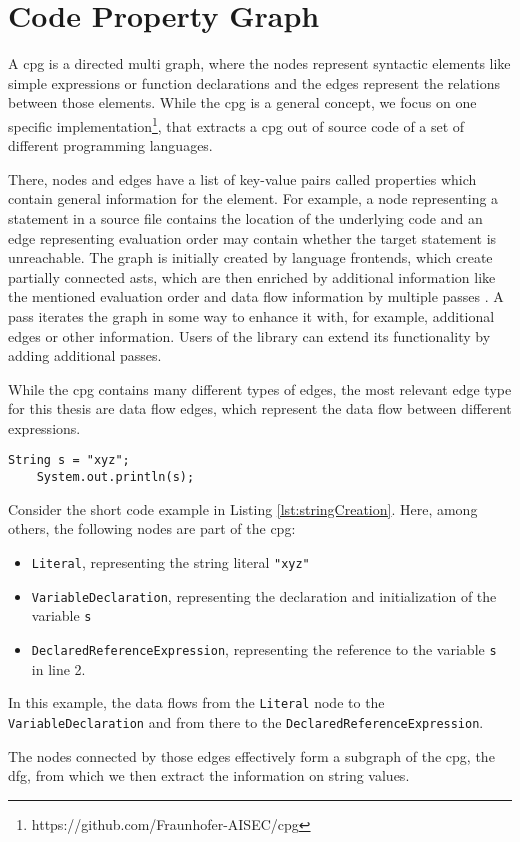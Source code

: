\section{Code Property Graph}\label{sec:background:cpg}
A \acf{cpg} is a directed multi graph, where the nodes represent syntactic elements like simple expressions or function declarations and the edges represent the relations between those elements.
While the \ac{cpg} is a general concept, we focus on one specific implementation\footnote{https://github.com/Fraunhofer-AISEC/cpg}, that extracts a \ac{cpg} out of source code of a set of different programming languages.

There, nodes and edges have a list of key-value pairs called properties which contain general information for the element. For example, a node representing a statement in a source file contains the location of the underlying code and an edge representing evaluation order may contain whether the target statement is unreachable. The graph is initially created by language frontends, which create partially connected \acp{ast}, which are then enriched by additional information like the mentioned evaluation order and data flow information by multiple passes \cite{cpg}. A pass iterates the graph in some way to enhance it with, for example, additional edges or other information.
Users of the library can extend its functionality by adding additional passes.

While the \ac{cpg} contains many different types of edges, the most relevant edge type for this thesis are data flow edges, which represent the data flow between different expressions.

\begin{lstlisting}[label={lst:stringCreation}, caption={\ac{cpg} example code}, captionpos=b, numbers=right]
	String s = "xyz";
	System.out.println(s);
\end{lstlisting}

Consider the short code example in Listing \ref{lst:stringCreation}. Here, among others, the following nodes are part of the \ac{cpg}:

\begin{itemize}
	\item \lstinline|Literal|, representing the string literal \lstinline{"xyz"}
	\item \lstinline|VariableDeclaration|, representing the declaration and initialization of the variable \lstinline|s|
	\item \lstinline|DeclaredReferenceExpression|, representing the reference to the variable \lstinline|s| in line 2.
\end{itemize}

In this example, the data flows from the \lstinline|Literal| node to the \lstinline|VariableDeclaration| and from there to the \lstinline|DeclaredReferenceExpression|.

The nodes connected by those edges effectively form a subgraph of the \ac{cpg}, the \ac{dfg}, from which we then extract the information on string values.



